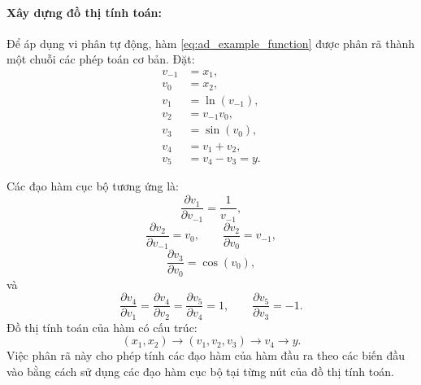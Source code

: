 \paragraph{Xây dựng đồ thị tính toán:\\}

Để áp dụng vi phân tự động, hàm \eqref{eq:ad_example_function} được phân rã thành một chuỗi các phép toán cơ bản. Đặt:
\begin{equation}
\begin{aligned}
    v_{-1} &= x_1, \\
    v_0 &= x_2, \\
    v_1 &= \ln(v_{-1}), \\
    v_2 &= v_{-1} v_0, \\
    v_3 &= \sin(v_0), \\
    v_4 &= v_1 + v_2, \\
    v_5 &= v_4 - v_3 = y.
\end{aligned}
\label{eq:ad_example_graph}
\end{equation}

Các đạo hàm cục bộ tương ứng là:
\begin{equation}
    \frac{\partial v_1}{\partial v_{-1}} = \frac{1}{v_{-1}},
\end{equation}
\begin{equation}
    \frac{\partial v_2}{\partial v_{-1}} = v_0, \qquad \frac{\partial v_2}{\partial v_0} = v_{-1},
\end{equation}
\begin{equation}
    \frac{\partial v_3}{\partial v_0} = \cos(v_0),
\end{equation}
và
\begin{equation}
    \frac{\partial v_4}{\partial v_1} = \frac{\partial v_4}{\partial v_2} = \frac{\partial v_5}{\partial v_4} = 1, \qquad \frac{\partial v_5}{\partial v_3} = -1.
\end{equation}
Đồ thị tính toán của hàm có cấu trúc:
\begin{equation}
    (x_1,x_2) \longrightarrow (v_1,v_2,v_3) \longrightarrow v_4 \longrightarrow y.
\end{equation}
Việc phân rã này cho phép tính các đạo hàm của hàm đầu ra theo các biến đầu vào bằng cách sử dụng các đạo hàm cục bộ tại từng nút của đồ thị tính toán.
